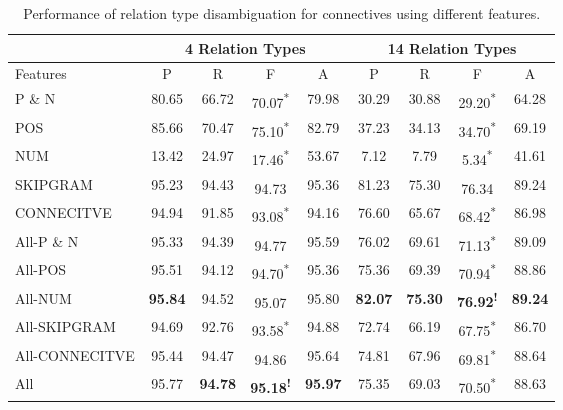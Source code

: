 \begin{table}[!htbp]
\centering
\begin{tabular}{|l|c|c|c|c|c|c|c|c|}
\hline
              & \multicolumn{4}{c|}{4 Relation Types}                            & \multicolumn{4}{c|}{14 Relation Types}                           \\ \hline
Features      &     P     &     R     &     F                        &     A     &     P     &     R     &     F                        &     A     \\ \hline
P \& N        &     80.65 &     66.72 &     70.07\textsuperscript{*} &     79.98 &     30.29 &     30.88 &     29.20\textsuperscript{*} &     64.28 \\ \hline
POS           &     85.66 &     70.47 &     75.10\textsuperscript{*} &     82.79 &     37.23 &     34.13 &     34.70\textsuperscript{*} &     69.19 \\ \hline
NUM           &     13.42 &     24.97 &     17.46\textsuperscript{*} &     53.67 &      7.12 &      7.79 &      5.34\textsuperscript{*} &     41.61 \\ \hline
SKIPGRAM      &     95.23 &     94.43 &     94.73\textsuperscript{ } &     95.36 &     81.23 &     75.30 &     76.34\textsuperscript{ } &     89.24 \\ \hline
CONNECITVE    &     94.94 &     91.85 &     93.08\textsuperscript{*} &     94.16 &     76.60 &     65.67 &     68.42\textsuperscript{*} &     86.98 \\ \hline
All-P \& N    &     95.33 &     94.39 &     94.77\textsuperscript{ } &     95.59 &     76.02 &     69.61 &     71.13\textsuperscript{*} &     89.09 \\ \hline
All-POS       &     95.51 &     94.12 &     94.70\textsuperscript{*} &     95.36 &     75.36 &     69.39 &     70.94\textsuperscript{*} &     88.86 \\ \hline
All-NUM       & \bf 95.84 &     94.52 &     95.07\textsuperscript{ } &     95.80 & \bf 82.07 & \bf 75.30 & \bf 76.92\textsuperscript{!} & \bf 89.24 \\ \hline
All-SKIPGRAM  &     94.69 &     92.76 &     93.58\textsuperscript{*} &     94.88 &     72.74 &     66.19 &     67.75\textsuperscript{*} &     86.70 \\ \hline
All-CONNECITVE&     95.44 &     94.47 &     94.86\textsuperscript{ } &     95.64 &     74.81 &     67.96 &     69.81\textsuperscript{*} &     88.64 \\ \hline
All           &     95.77 & \bf 94.78 & \bf 95.18\textsuperscript{!} & \bf 95.97 &     75.35 &     69.03 &     70.50\textsuperscript{*} &     88.63 \\ \hline

\end{tabular}
\caption{\label{t:sense-features} Performance of relation type
disambiguation for connectives using different features. }
\end{table}

